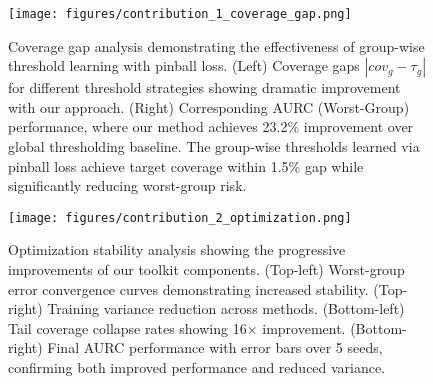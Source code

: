 

\begin{figure}[htbp]
\centering
\texttt{[image: figures/contribution\_1\_coverage\_gap.png]}
\caption{Coverage gap analysis demonstrating the effectiveness of group-wise threshold learning with pinball loss. (Left) Coverage gaps $|cov_g - \tau_g|$ for different threshold strategies showing dramatic improvement with our approach. (Right) Corresponding AURC (Worst-Group) performance, where our method achieves 23.2\% improvement over global thresholding baseline. The group-wise thresholds learned via pinball loss achieve target coverage within 1.5\% gap while significantly reducing worst-group risk.}
\label{fig:coverage_gap}
\end{figure}

\begin{figure}[htbp]
\centering
\texttt{[image: figures/contribution\_2\_optimization.png]}
\caption{Optimization stability analysis showing the progressive improvements of our toolkit components. (Top-left) Worst-group error convergence curves demonstrating increased stability. (Top-right) Training variance reduction across methods. (Bottom-left) Tail coverage collapse rates showing 16$\times$ improvement. (Bottom-right) Final AURC performance with error bars over 5 seeds, confirming both improved performance and reduced variance.}
\label{fig:optimization_stability}
\end{figure}

